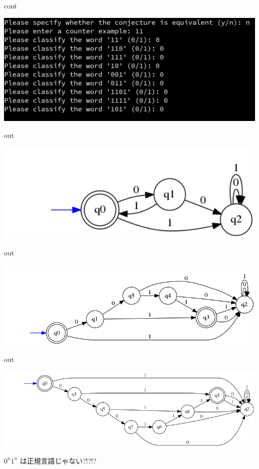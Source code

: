 \documentclass[professionalfont, 12pt, dvipdfmx, default, cjk]{beamer}
\begin{document}
\begin{frame}{cont}

\centering
\includegraphics[width=1.0\textwidth,bb=0 0 1472 607]{img/online2.jpg}

\end{frame}

\begin{frame}{out}

\includegraphics[width=1.0\textwidth,bb=0 0 413 151]{img/2.png}

\end{frame}

\begin{frame}{out}

\includegraphics[width=1.0\textwidth,bb=0 0 752 241]{img/3.png}

\end{frame}

\begin{frame}{out}

\includegraphics[width=1.0\textwidth,bb=0 0 768 231]{img/4.png}

\vfill
\(0^n1^n\) は正規言語じゃない?!?!?

\end{frame}
\end{document}
